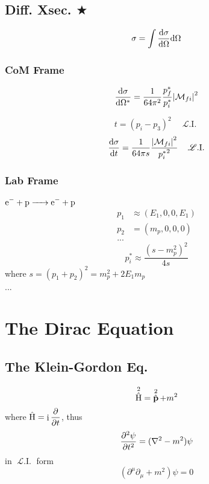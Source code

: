 \documentclass[a4paper]{article}
\DeclareMathOperator{\I}{\mathrm{i}}
\DeclareMathOperator{\hH}{\hat{H}}
\DeclareMathOperator{\hp}{\hat{\vb{p}}}
\DeclareMathOperator{\LI}{\mathscr{L}.I.}
\newcommand{\dis}{\displaystyle}
\numberwithin{equation}{section}
\begin{document}
\subsection{Diff. Xsec. $ \bigstar $}
\begin{equation}\label{key}
\sigma = \int\dv{\sigma}{\Omega}\dd\Omega
\end{equation}
\subsubsection{CoM Frame}
\begin{equation}\label{key}
\dv{\sigma}{\Omega^*} = \dfrac{1}{64\pi^2}\dfrac{p_f^*}{p_i^*} \abs{\mathcal{M}_{fi}}^2
\end{equation}

\begin{equation}\label{key}
t = (p_i - p_3)^2   \quad \LI
\end{equation}
\begin{equation}\label{key}
\dv{\sigma}{t} = \dfrac{1}{64\pi s} \dfrac{\abs{\mathcal{M}_{fi}}^2}{{p_i^*}^2}  \quad \LI
\end{equation}

\subsubsection{Lab Frame}
$ \ce{e^- + p -> e^- + p} $
\begin{equation}\label{key}
\begin{aligned}
p_1 &\approx (E_1, 0, 0, E_1)\\
p_2 &= (m_p, 0, 0, 0)\\
... 
\end{aligned}
\end{equation}
\begin{equation}\label{key}
p_i^* \approx \dfrac{(s - m_p^2)^2}{4s}
\end{equation}
where $ s = (p_1 + p_2)^2 = m_p^2 + 2E_1m_p $\\

...


\section{The Dirac Equation}
\subsection{The Klein-Gordon Eq.}
\begin{equation}\label{key}
\hH^2 = \hp^2 + m^2
\end{equation}
where $ \hH = \dis\I\pdv{t} $, thus
\begin{equation}\label{key}
\pdv[2]{\psi}{t} = (\nabla^2 - m^2)\psi
\end{equation}
in $ \LI $ form
\begin{equation}\label{key}
(\partial^\mu\partial_\mu + m^2)\psi = 0
\end{equation}
\end{document}
